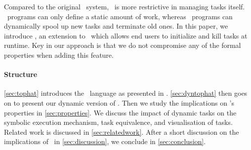 Compared to the original \ITASKS\ system, \TOPHAT\ is more restrictive in managing tasks itself.
\TOPHAT\ programs can only define a static amount of work, whereas \ITASKS\ programs can dynamically spool up new tasks and terminate old ones.
In this paper, we introduce \DYNTOPHAT, an extension to \TOPHAT\ which allows end users to initialize and kill tasks at runtime.
Key in our approach is that we do not compromise any of the formal properties when adding this feature.


\paragraph{Structure}

\cref{sec:tophat} introduces the \TOPHAT\ language as presented in \citet{Steenvoorden22}.
\cref{sec:dyntophat} then goes on to present our dynamic version of \TOPHAT.
Then we study the implications on \TOPHAT's properties in \cref{sec:properties}.
We discuss the impact of dynamic tasks on the symbolic execution mechanism, task equivalence, and visualisation of tasks.
Related work is discussed in \cref{sec:relatedwork}.
After a short discussion on the implications of \DYNTOPHAT\ in \cref{sec:discussion},
we conclude in \cref{sec:conclusion}.
